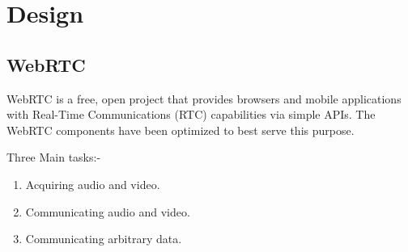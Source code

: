 \chapter{Design}
\section{WebRTC}
WebRTC is a free, open project that provides browsers and mobile applications with Real-Time Communications (RTC) capabilities via simple APIs. The WebRTC components have been optimized to best serve this purpose.\cite{webrtc}

Three Main tasks:-
\begin{enumerate}
  \item Acquiring audio and video.
  \item Communicating audio and video.
  \item Communicating arbitrary data.
\end{enumerate}


